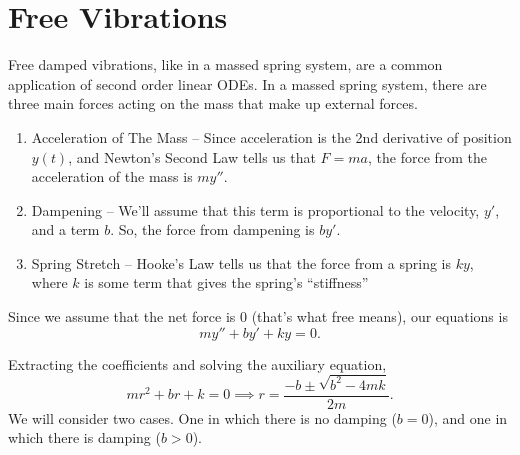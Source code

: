\section{Free Vibrations}
\noindent
Free damped vibrations, like in a massed spring system, are a common application of second order linear ODEs.
In a massed spring system, there are three main forces acting on the mass that make up external forces.
\begin{enumerate}[label=\arabic*)]
	\item Acceleration of The Mass -- Since acceleration is the 2nd derivative of position $y(t)$, and Newton's Second Law tells us that $F = ma$, the force from the acceleration of the mass is $my''$.
	\item Dampening -- We'll assume that this term is proportional to the velocity, $y'$, and a term $b$. So, the force from dampening is $by'$.
	\item Spring Stretch -- Hooke's Law tells us that the force from a spring is $ky$, where $k$ is some term that gives the spring's ``stiffness''
\end{enumerate}
Since we assume that the net force is 0 (that's what free means), our equations is
\begin{equation*}
	my'' + by' + ky = 0.
\end{equation*}

\noindent
Extracting the coefficients and solving the auxiliary equation,
\begin{equation*}
	mr^2 + br + k = 0 \implies r = \frac{-b \pm \sqrt{b^2 - 4mk}}{2m}.
\end{equation*}
We will consider two cases.
One in which there is no damping ($b = 0$), and one in which there is damping ($b > 0$).


